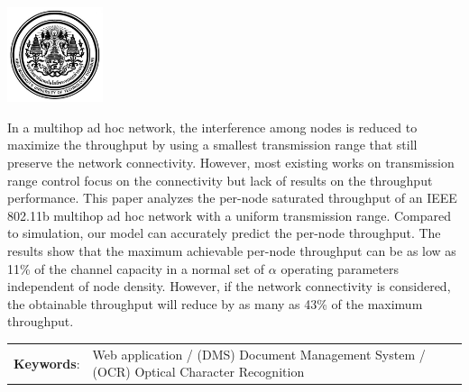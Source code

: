 \documentclass[12pt,oneside,openright,a4paper]{cpe-thai-project}
\begin{document}
\pdfstringdefDisableCommands{%
\let\MakeUppercase\relax
}

\begin{center}
  \includegraphics[width=2.8cm]{logo02.jpg}
\end{center}
\vspace*{-1cm}

\maketitlepage
\makesignaturepage 

\abstract

In a multihop ad hoc network, the interference among nodes is
  reduced to maximize the throughput by using a smallest transmission
  range that still preserve the network connectivity. However, most
  existing works on transmission range control focus on the
  connectivity but lack of results on the throughput performance. This
  paper analyzes the per-node saturated throughput of an IEEE 802.11b
  multihop ad hoc network with a uniform transmission range. Compared
  to simulation, our model can accurately predict the per-node
  throughput.  The results show that the maximum achievable per-node
  throughput can be as low as 11\% of the channel capacity in a normal
  set of $\alpha$ operating parameters independent of node density. However, if
  the network connectivity is considered, the obtainable throughput
  will reduce by as many as 43\% of the maximum throughput. 

\begin{flushleft}
\begin{tabular*}{\textwidth}{@{}lp{}}
\textbf{Keywords}: & Web application / (DMS) Document Management System / (OCR) Optical Character Recognition
\end{tabular*}
\end{flushleft}
\endabstract

\thaiabstract
\end{document}
